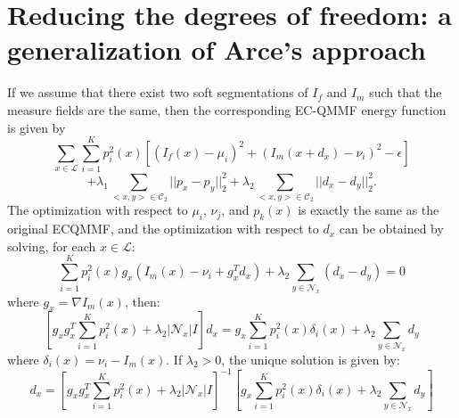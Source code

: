 \documentclass[11pt]{article}
\begin{document}
\section{Reducing the degrees of freedom: a generalization of Arce's approach}
If we assume that there exist two soft segmentations of $I_f$ and $I_m$ such that the
measure fields are the same, then the corresponding EC-QMMF energy function is given by
\begin{displaymath}
	\sum_{x\in \mathcal{L}} \sum_{i=1}^{K}p_{i}^{2}(x) \left[(I_{f}(x) - \mu_i)^{2} + (I_{m}(x + d_x) - \nu_i)^{2} - \epsilon \right]
\end{displaymath}
\begin{displaymath}
	+ \lambda_{1}\sum_{<x,y>\in\mathcal{C}_{2}}||p_{x} - p_{y}||_{2}^{2} + \lambda_{2}\sum_{<x,y>\in \mathcal{C}_{2}}||d_{x} - d_{y}||_{2}^{2}.
\end{displaymath}
The optimization with respect to $\mu_i$, $\nu_{j}$, and $p_{k}(x)$ is exactly the same as the original ECQMMF, and the optimization with respect to $d_x$ can be obtained by solving, for each $x \in \mathcal{L}$:
\begin{equation}
	\sum_{i=1}^{K}p_{i}^{2}(x)g_{x}(I_{m}(x)- \nu_{i} + g_{x}^{T}d_{x}) + \lambda_{2} \sum_{y\in \mathcal{N}_{x}}(d_{x} - d_{y}) = 0
\end{equation}
where $g_{x} = \nabla I_m(x)$, then:
\begin{equation}
	\left[g_{x}g_{x}^{T}\sum_{i=1}^{K}p_{i}^{2}(x) + \lambda_{2}|\mathcal{N}_{x}|I\right]d_x=g_{x}\sum_{i=1}^{K}p_{i}^{2}(x)\delta_{i}(x) + \lambda_{2} \sum_{y\in \mathcal{N}_{x}}d_{y}
\end{equation}
where $\delta_{i}(x) = \nu_{i} - I_{m}(x)$. If $\lambda_{2}>0$, the unique solution is given by:
\begin{equation}
	d_{x} = \left[g_{x}g_{x}^{T}\sum_{i=1}^{K}p_{i}^{2}(x) + \lambda_{2}|\mathcal{N}_{x}|I\right]^{-1} \left[ g_{x}\sum_{i=1}^{K}p_{i}^{2}(x)\delta_{i}(x) + \lambda_{2} \sum_{y\in \mathcal{N}_{x}}d_{y} \right]
\end{equation}
\end{document}
